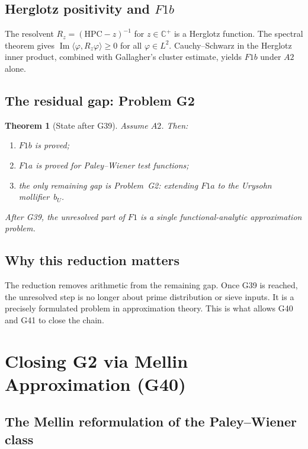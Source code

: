 \documentclass[11pt,a4paper]{article}
\newtheorem{theorem}{Theorem}[section]
\begin{document}
\subsection{Herglotz positivity and $F1b$}

The resolvent $R_z=({\mathrm{HPC}}-z)^{-1}$ for $z\in\mathbb{C}^+$ is a Herglotz function.  The spectral theorem gives $\operatorname{Im}\langle \varphi, R_z\varphi\rangle \ge 0$ for all $\varphi\in L^2$.  Cauchy--Schwarz in the Herglotz inner product, combined with Gallagher's cluster estimate, yields $F1b$ under $A2$ alone.

\subsection{The residual gap: Problem G2}

\begin{theorem}[State after G39]
\label{thm:G39-state}
Assume $A2$.  Then:
\begin{enumerate}[nosep]
    \item $F1b$ is proved;
    \item $F1a$ is proved for Paley--Wiener test functions;
    \item the only remaining gap is Problem~G2: extending $F1a$ to the Urysohn mollifier~$b_U$.
\end{enumerate}
After G39, the unresolved part of $F1$ is a single functional-analytic approximation problem.
\end{theorem}

\subsection{Why this reduction matters}

The reduction removes arithmetic from the remaining gap.  Once G39 is reached, the unresolved step is no longer about prime distribution or sieve inputs.  It is a precisely formulated problem in approximation theory.  This is what allows G40 and G41 to close the chain.

\section{Closing G2 via Mellin Approximation (G40)}

\subsection{The Mellin reformulation of the Paley--Wiener class}
\end{document}
